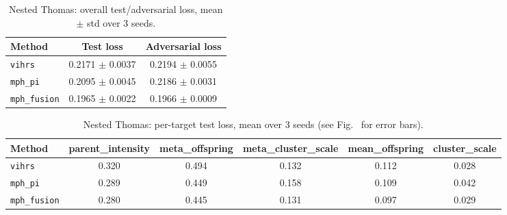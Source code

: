 \begin{table}[htbp]
\centering
\small
\begin{tabular}{lcc}
\toprule
Method & Test loss & Adversarial loss \\
\midrule
\texttt{vihrs} & 0.2171 $\pm$ 0.0037 & 0.2194 $\pm$ 0.0055 \\
\texttt{mph\_pi} & 0.2095 $\pm$ 0.0045 & 0.2186 $\pm$ 0.0031 \\
\texttt{mph\_fusion} & 0.1965 $\pm$ 0.0022 & 0.1966 $\pm$ 0.0009 \\
\bottomrule
\end{tabular}
\caption{Nested Thomas: overall test/adversarial loss, mean $\pm$ std over 3 seeds.}
\label{tab:nested-thomas-overall}
\end{table}

\begin{table}[htbp]
\centering
\small
\begin{tabular}{lccccc}
\toprule
Method & parent\_intensity & meta\_offspring & meta\_cluster\_scale & mean\_offspring & cluster\_scale \\
\midrule
\texttt{vihrs} & 0.320 & 0.494 & 0.132 & 0.112 & 0.028 \\
\texttt{mph\_pi} & 0.289 & 0.449 & 0.158 & 0.109 & 0.042 \\
\texttt{mph\_fusion} & 0.280 & 0.445 & 0.131 & 0.097 & 0.029 \\
\bottomrule
\end{tabular}
\caption{Nested Thomas: per-target test loss, mean over 3 seeds (see Fig.~ for error bars).}
\label{tab:nested-thomas-per-target}
\end{table}